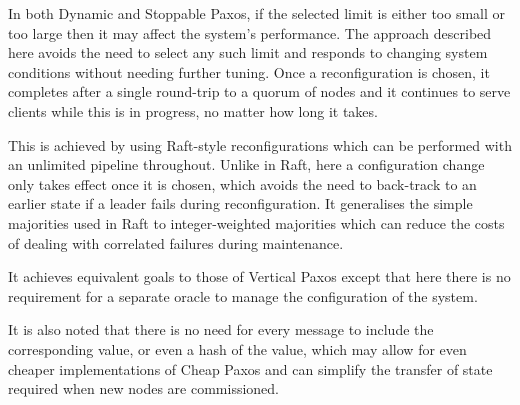 \documentclass[journal]{IEEEtran}
\begin{document}
In both Dynamic and Stoppable Paxos, if the selected limit is either too small
or too large then it may affect the system's performance. The approach
described here avoids the need to select any such limit and responds to
changing system conditions without needing further tuning. Once a
reconfiguration is chosen, it completes after a single round-trip to a quorum
of nodes and it continues to serve clients while this is in progress, no matter
how long it takes.

This is achieved by using Raft-style reconfigurations\cite{raft} which can be
performed with an unlimited pipeline throughout. Unlike in Raft, here a
configuration change only takes effect once it is chosen, which avoids the need
to back-track to an earlier state if a leader fails during reconfiguration. It
generalises the simple majorities used in Raft to integer-weighted majorities
which can reduce the costs of dealing with correlated failures during
maintenance.

It achieves equivalent goals to those of Vertical Paxos\cite{vertical-paxos}
except that here there is no requirement for a separate oracle to manage the
configuration of the system.

It is also noted that there is no need for every message to include the
corresponding value, or even a hash of the value, which may allow for even
cheaper implementations of Cheap Paxos\cite{cheap-paxos} and can simplify the
transfer of state\cite{vertical-paxos} required when new nodes are
commissioned.

%
%


\end{document}
